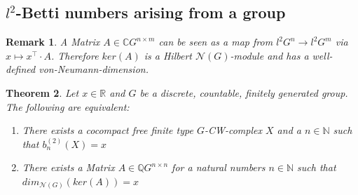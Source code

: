 \documentclass[12pt,a4paper]{scrartcl}
\newtheorem{Theorem}{Theorem}[section]
\newtheorem{Remark}[Theorem]{Remark}
\numberwithin{equation}{section}
\newcommand{\C}{\mathbb{C}} %
\newcommand{\R}{\mathbb{R}} %
\newcommand{\Q}{\mathbb{Q}} %
\newcommand{\N}{\mathbb{N}} %
\newcommand{\2}{\mathbb{Z} / 2 \mathbb{Z}}
\newcommand{\1}{\overline{1}}
\newcommand{\0}{\overline{0}}
\begin{document}
\subsection{$l^2$-Betti numbers arising from a group}
\begin{Remark}
	A Matrix $A \in \C G^{n \times m}$ can be seen as a map from $l^2G^n \to l^2G^m$ via $x \mapsto x^{\top} \cdot A$. Therefore $ker(A)$ is a Hilbert $\mathcal{N}(G)$-module and has a well-defined von-Neumann-dimension. 
\end{Remark}
\begin{Theorem}
	Let $x \in \R$ and $G$ be a discrete, countable, finitely generated group. The following are equivalent:
	\begin{enumerate}
		\item There exists a cocompact free finite type $G$-CW-complex $X$ and a $n \in \N$ such that $b_n^{(2)}(X)=x$
		\item There exists a Matrix $A \in \Q G^{n \times n}$ for a natural numbers $n \in \N$ such that \newline $dim_{\mathcal{N}(G)}(ker (A))=x$
	\end{enumerate}
\end{Theorem}
\end{document}
